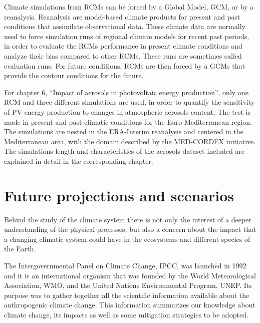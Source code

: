 Climate simulations from RCMs can be forced by a Global Model, GCM, or by a reanalysis. Reanalysis are model-based climate products for present and past conditions that assimilate observational data. These climate data are normally used to force simulation runs of regional climate models for recent past periods, in order to evaluate the RCMs performance in present climate conditions and analyze their bias compared to other RCMs. These runs are sometimes called evaluation runs. For future conditions, RCMs are then forced by a GCMs that provide the contour conditions for the future.  

For chapter 6, ``Impact of aerosols in photovoltaic energy production'', only one RCM and three different simulations are used, in order to quantify the sensitivity of PV energy production to changes in atmospheric aerosols content. The test is made in present and past climatic conditions for the Euro-Mediterranean region. The simulations are nested in the ERA-Interim reanalysis and centered in the Mediterranean area, with the domain described by the MED-CORDEX initiative. The simulations length and characteristics of the aerosols dataset included are explained in detail in the corresponding chapter.
 

\section{Future projections and scenarios}

Behind the study of the climate system there is not only the interest of a deeper understanding of the physical processes, but also a concern about the impact that a changing climatic system could have in the ecosystems and different species of the Earth.

The Intergovernmental Panel on Climate Change, IPCC, was launched in 1992 and it is an international organism that was founded by the World Meteorological Association, WMO, and the United Nations Environmental Program, UNEP. Its purpose was to gather together all the scientific information available about the anthropogenic climate change. This information summarizes our knowledge about climate change, its impacts as well as some mitigation strategies to be adopted.

